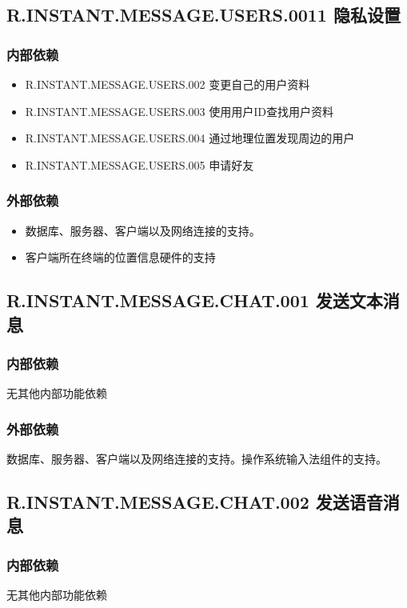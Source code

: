 {    \subsection{R.INSTANT.MESSAGE.USERS.0011 隐私设置}
    \subsubsection{内部依赖}
    \begin{itemize}
        \item R.INSTANT.MESSAGE.USERS.002 变更自己的用户资料
        \item R.INSTANT.MESSAGE.USERS.003 使用用户ID查找用户资料
        \item R.INSTANT.MESSAGE.USERS.004 通过地理位置发现周边的用户
        \item R.INSTANT.MESSAGE.USERS.005 申请好友
    \end{itemize}
    \subsubsection{外部依赖}
    \begin{itemize}
        \item 数据库、服务器、客户端以及网络连接的支持。
        \item 客户端所在终端的位置信息硬件的支持
    \end{itemize}
    
}


\subsection{R.INSTANT.MESSAGE.CHAT.001 发送文本消息}
\subsubsection{内部依赖}
    无其他内部功能依赖
\subsubsection{外部依赖}
    数据库、服务器、客户端以及网络连接的支持。操作系统输入法组件的支持。

	
\subsection{R.INSTANT.MESSAGE.CHAT.002 发送语音消息}
\subsubsection{内部依赖}
    无其他内部功能依赖
